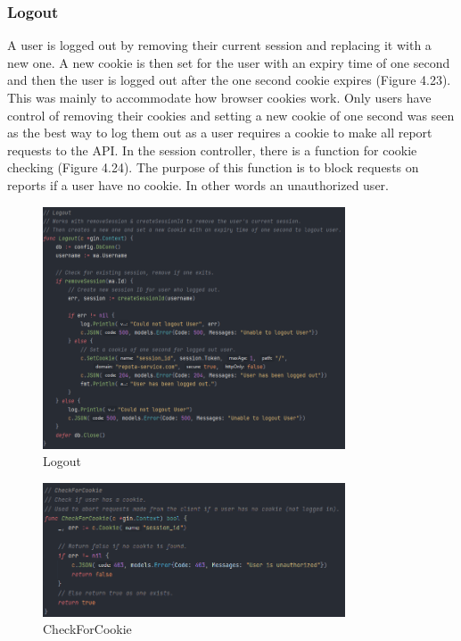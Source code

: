 \subsubsection{Logout}
A user is logged out by removing their current session and replacing it with a new one. A new cookie is then set for the user with an expiry time of one second and then the user is logged out after the one second cookie expires (Figure 4.23). This was mainly to accommodate how browser cookies work. Only users have control of removing their cookies and setting a new cookie of one second was seen as the best way to log them out as a user requires a cookie to make all report requests to the API. In the session controller, there is a function for cookie checking (Figure 4.24). The purpose of this function is to block requests on reports if a user have no cookie. In other words an unauthorized user.

\begin{figure}[H]
    \caption{Logout}
    \label{image:logout}
    \centering
    \includegraphics[width=0.8\textwidth]{images/horton/account_system/logout_func.png}
\end{figure}

\begin{figure}[H]
    \caption{CheckForCookie}
    \label{image:cookieCheck}
    \centering
    \includegraphics[width=0.8\textwidth]{images/horton/account_system/check_cookie.png}
\end{figure}

